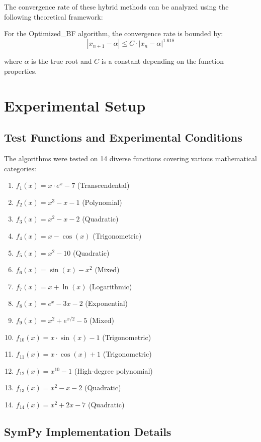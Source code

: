 \documentclass[11pt,a4paper]{article}
\begin{document}
The convergence rate of these hybrid methods can be analyzed using the following theoretical framework:

For the Optimized\_BF algorithm, the convergence rate is bounded by:
\begin{equation}
|x_{n+1} - \alpha| \leq C \cdot |x_n - \alpha|^{1.618}
\end{equation}

where $\alpha$ is the true root and $C$ is a constant depending on the function properties.

\section{Experimental Setup}

\subsection{Test Functions and Experimental Conditions}

The algorithms were tested on 14 diverse functions covering various mathematical categories:

\begin{enumerate}
    \item $f_1(x) = x \cdot e^x - 7$ (Transcendental)
    \item $f_2(x) = x^3 - x - 1$ (Polynomial)
    \item $f_3(x) = x^2 - x - 2$ (Quadratic)
    \item $f_4(x) = x - \cos(x)$ (Trigonometric)
    \item $f_5(x) = x^2 - 10$ (Quadratic)
    \item $f_6(x) = \sin(x) - x^2$ (Mixed)
    \item $f_7(x) = x + \ln(x)$ (Logarithmic)
    \item $f_8(x) = e^x - 3x - 2$ (Exponential)
    \item $f_9(x) = x^2 + e^{x/2} - 5$ (Mixed)
    \item $f_{10}(x) = x \cdot \sin(x) - 1$ (Trigonometric)
    \item $f_{11}(x) = x \cdot \cos(x) + 1$ (Trigonometric)
    \item $f_{12}(x) = x^{10} - 1$ (High-degree polynomial)
    \item $f_{13}(x) = x^2 - x - 2$ (Quadratic)
    \item $f_{14}(x) = x^2 + 2x - 7$ (Quadratic)
\end{enumerate}

\subsection{SymPy Implementation Details}
\end{document}
